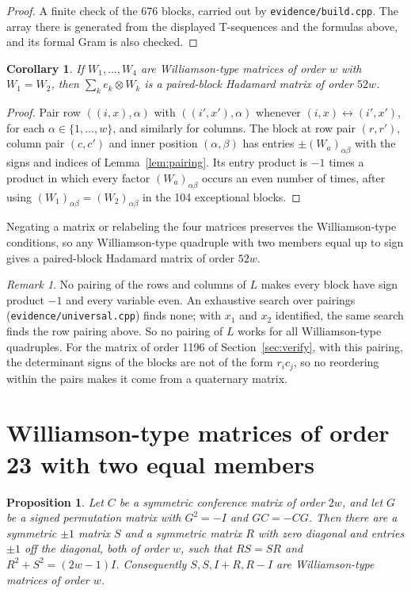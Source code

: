 \documentclass[10pt]{article}
\newtheorem{proposition}[theorem]{Proposition}
\newtheorem{corollary}[theorem]{Corollary}
\theoremstyle{definition}
\theoremstyle{remark}
\newtheorem*{remark}{Remark}
\begin{document}
\begin{proof}
A finite check of the 676 blocks, carried out by \texttt{evidence/build.cpp}. The array there is generated from the displayed T-sequences and the formulas above, and its formal Gram is also checked.
\end{proof}

\begin{corollary}\label{cor:pb}
If $W_1,\dots,W_4$ are Williamson-type matrices of order $w$ with $W_1=W_2$, then $\sum_ke_k\otimes W_k$ is a paired-block Hadamard matrix of order $52w$.
\end{corollary}

\begin{proof}
Pair row $((i,x),\alpha)$ with $((i',x'),\alpha)$ whenever $(i,x)\leftrightarrow(i',x')$, for each $\alpha\in\{1,\dots,w\}$, and similarly for columns. The block at row pair $(r,r')$, column pair $(c,c')$ and inner position $(\alpha,\beta)$ has entries $\pm(W_{a})_{\alpha\beta}$ with the signs and indices of Lemma~\ref{lem:pairing}. Its entry product is $-1$ times a product in which every factor $(W_a)_{\alpha\beta}$ occurs an even number of times, after using $(W_1)_{\alpha\beta}=(W_2)_{\alpha\beta}$ in the 104 exceptional blocks.
\end{proof}

Negating a matrix or relabeling the four matrices preserves the Williamson-type conditions, so any Williamson-type quadruple with two members equal up to sign gives a paired-block Hadamard matrix of order $52w$.

\begin{remark}
No pairing of the rows and columns of $L$ makes every block have sign product $-1$ and every variable even. An exhaustive search over pairings (\texttt{evidence/universal.cpp}) finds none; with $x_1$ and $x_2$ identified, the same search finds the row pairing above. So no pairing of $L$ works for all Williamson-type quadruples. For the matrix of order 1196 of Section~\ref{sec:verify}, with this pairing, the determinant signs of the blocks are not of the form $r_ic_j$, so no reordering within the pairs makes it come from a quaternary matrix.
\end{remark}

\section{Williamson-type matrices of order 23 with two equal members}\label{sec:order23}
\begin{proposition}\label{prop:split}
Let $C$ be a symmetric conference matrix of order $2w$, and let $G$ be a signed permutation matrix with $G^2=-I$ and $GC=-CG$. Then there are a symmetric $\pm1$ matrix $S$ and a symmetric matrix $R$ with zero diagonal and entries $\pm1$ off the diagonal, both of order $w$, such that $RS=SR$ and $R^2+S^2=(2w-1)I$. Consequently $S,S,I+R,R-I$ are Williamson-type matrices of order $w$.
\end{proposition}
\end{document}
